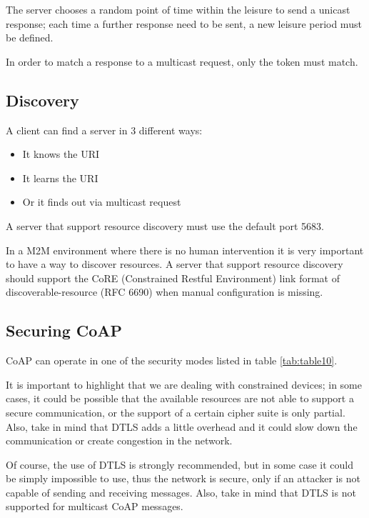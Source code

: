 	The server chooses a random point of time within the leisure to send a unicast response; 
	each time a further response need to be sent, a new leisure period must be defined.\newline
	
	In order to match a response to a multicast request, only the token must match.\newline
	
	\subsection{Discovery}
	A client can find a server in 3 different ways:
	\begin{itemize}
		\item It knows the URI
		\item It learns the URI
		\item Or it finds out via multicast request
	\end{itemize}

	A server that support resource discovery must use the default port 5683.\newline
	
	In a M2M environment where there is no human intervention it is very important to have a way to discover resources.\newline
	A server that support resource discovery should support the CoRE (Constrained Restful Environment) link format of discoverable-resource (RFC 6690) when manual configuration is missing.\newline
	
	\subsection{Securing CoAP}
	CoAP can operate in one of the security modes listed in table \ref{tab:table10}.
	
	
	
	It is important to highlight that we are dealing with constrained devices; in some cases, it could be possible that the available resources are not able to support a secure communication, or the support of a certain cipher suite is only partial.\newline
	Also, take in mind that DTLS adds a little overhead and it could slow down the communication or create congestion in the network.\newline
	
	Of course, the use of DTLS is strongly recommended, but in some case it could be simply impossible to use, thus the network is secure, only if an attacker is not capable of sending and receiving messages.\newline
	Also, take in mind that DTLS is not supported for multicast CoAP messages.\newline
	
